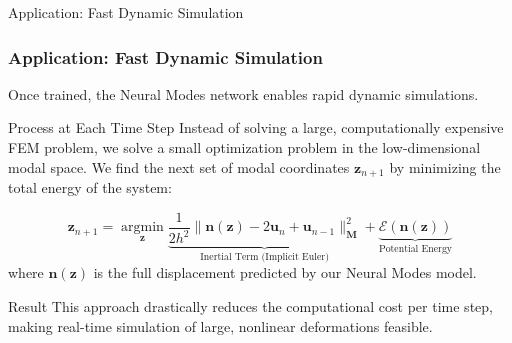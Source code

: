 \documentclass{beamer}
\DeclareMathOperator{\argmin}{argmin}
\begin{document}
\begin{frame}{Application: Fast Dynamic Simulation}
    \frametitle{Application: Fast Dynamic Simulation}
    
    Once trained, the Neural Modes network enables rapid dynamic simulations.
    
    \begin{block}{Process at Each Time Step}
        Instead of solving a large, computationally expensive FEM problem, we solve a small optimization problem in the low-dimensional modal space. We find the next set of modal coordinates \(\mathbf{z}_{n+1}\) by minimizing the total energy of the system:
        
        \begin{equation}
            \mathbf{z}_{n+1} = \underset{\mathbf{z}}{\argmin} \underbrace{\frac{1}{2h^2} \|\bm{n}(\mathbf{z}) - 2\bm{u}_n + \bm{u}_{n-1}\|_{\bm{M}}^2}_{\text{Inertial Term (Implicit Euler)}} + \underbrace{\mathcal{E}(\bm{n}(\mathbf{z}))}_{\text{Potential Energy}}
        \end{equation}
        where \(\bm{n}(\mathbf{z})\) is the full displacement predicted by our Neural Modes model.
    \end{block}
    
    \begin{alertblock}{Result}
        This approach drastically reduces the computational cost per time step, making real-time simulation of large, nonlinear deformations feasible.
    \end{alertblock}
\end{frame}
\end{document}
